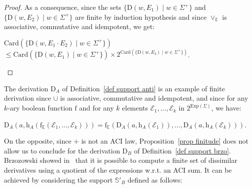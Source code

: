 \documentclass{article}
\begin{document}
\begin{proof}
          As a consequence, since the sets $\{\mathrm{D}(w,E_1)\mid w\in\Sigma^{+}\}$ and $\{\mathrm{D}(w,E_2)\mid w\in\Sigma^{+}\}$ are finite by induction hypothesis and since $\vee_{\mathbb{E}}$ is associative, commutative and idempotent,  we get:
          
         \begin{center}
            $\mathrm{Card}(\{\mathrm{D}(w,E_1\cdot E_2)\mid w\in\Sigma^{+}\})$\\
            $\leq \mathrm{Card}(\{\mathrm{D}(w,E_1)\mid w\in\Sigma^{+}\})\times 2^{\mathrm{Card}(\{\mathrm{D}(w,E_2)\mid w\in\Sigma^{+}\})}$.
         \end{center}
         
\end{proof}
  


 
  
The derivation $\mathrm{D}_A$ of Definition~\ref{def support anti} is an example of finite derivation since $\cup$ is associative, commutative and idempotent, and since for any $k$-ary boolean function $\mathrm{f}$ and for any $k$ elements $\mathcal{E}_1,\ldots,\mathcal{E}_k$ in $2^{\mathrm{Exp}(\Sigma)}$, we have:
        
        \centerline{
          $\mathrm{D}_A(a,\mathrm{h}_A(\mathrm{f}_{\mathbb{E}}(\mathcal{E}_1,\ldots,\mathcal{E}_k)))=\mathrm{f}_{\mathbb{E}}(\mathrm{D}_A(a,\mathrm{h}_A(\mathcal{E}_1)),\ldots,\mathrm{D}_A(a,\mathrm{h}_A(\mathcal{E}_k)))$.
        }
      
    On the opposite, since $+$ is not an ACI law, Proposition~\ref{prop finitude} does not allow us to conclude for the derivation $\mathrm{D}_B$ of Definition~\ref{def support brzo}. Brzozowski showed in~\cite{Brz64} that it is possible to compute a finite set of dissimilar derivatives using a quotient of the expressions  w.r.t. an ACI sum. It can be achieved by considering the support $\mathbb{S}'_B$ defined as follows:
    
\end{document}
